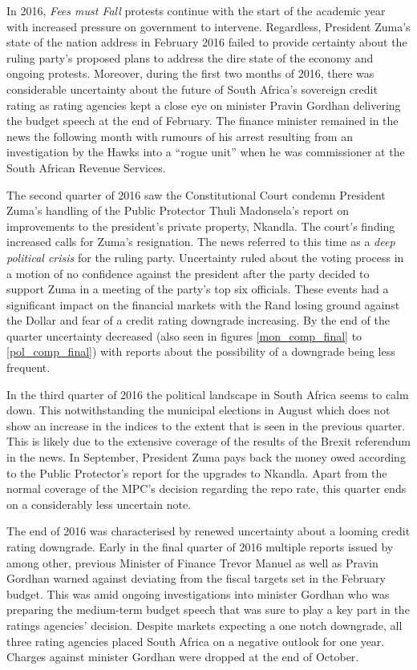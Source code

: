 \documentclass[11pt,preprint, authoryear]{elsarticle}
\numberwithin{equation}{section}
\numberwithin{figure}{section}
\numberwithin{table}{section}
\begin{document}
In 2016, \emph{Fees must Fall} protests continue with the start of the
academic year with increased pressure on government to intervene.
Regardless, President Zuma's state of the nation address in February
2016 failed to provide certainty about the ruling party's proposed plans
to address the dire state of the economy and ongoing protests. Moreover,
during the first two months of 2016, there was considerable uncertainty
about the future of South Africa's sovereign credit rating as rating
agencies kept a close eye on minister Pravin Gordhan delivering the
budget speech at the end of February. The finance minister remained in
the news the following month with rumours of his arrest resulting from
an investigation by the Hawks into a ``rogue unit'' when he was
commissioner at the South African Revenue Services.

The second quarter of 2016 saw the Constitutional Court condemn
President Zuma's handling of the Public Protector Thuli Madonsela's
report on improvements to the president's private property, Nkandla. The
court's finding increased calls for Zuma's resignation. The news
referred to this time as a \emph{deep political crisis} for the ruling
party. Uncertainty ruled about the voting process in a motion of no
confidence against the president after the party decided to support Zuma
in a meeting of the party's top six officials. These events had a
significant impact on the financial markets with the Rand losing ground
against the Dollar and fear of a credit rating downgrade increasing. By
the end of the quarter uncertainty decreased (also seen in figures
\ref{mon_comp_final} to \ref{pol_comp_final}) with reports about the
possibility of a downgrade being less frequent.

In the third quarter of 2016 the political landscape in South Africa
seems to calm down. This notwithstanding the municipal elections in
August which does not show an increase in the indices to the extent that
is seen in the previous quarter. This is likely due to the extensive
coverage of the results of the Brexit referendum in the news. In
September, President Zuma pays back the money owed according to the
Public Protector's report for the upgrades to Nkandla. Apart from the
normal coverage of the MPC's decision regarding the repo rate, this
quarter ends on a considerably less uncertain note.

The end of 2016 was characterised by renewed uncertainty about a looming
credit rating downgrade. Early in the final quarter of 2016 multiple
reports issued by among other, previous Minister of Finance Trevor
Manuel as well as Pravin Gordhan warned against deviating from the
fiscal targets set in the February budget. This was amid ongoing
investigations into minister Gordhan who was preparing the medium-term
budget speech that was sure to play a key part in the ratings agencies'
decision. Despite markets expecting a one notch downgrade, all three
rating agencies placed South Africa on a negative outlook for one year.
Charges against minister Gordhan were dropped at the end of October.
\end{document}

